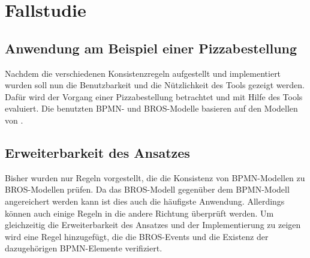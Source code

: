 \chapter{Fallstudie}

\section{Anwendung am Beispiel einer Pizzabestellung}

Nachdem die verschiedenen Konsistenzregeln aufgestellt und implementiert wurden soll nun die Benutzbarkeit und die Nützlichkeit des Tools gezeigt werden.
Dafür wird der Vorgang einer Pizzabestellung betrachtet und mit Hilfe des Tools evaluiert.
Die benutzten BPMN- und BROS-Modelle basieren auf den Modellen von \cite{Schoen}.

\section{Erweiterbarkeit des Ansatzes}

Bisher wurden nur Regeln vorgestellt, die die Konsistenz von BPMN-Modellen zu BROS-Modellen prüfen.
Da das BROS-Modell gegenüber dem BPMN-Modell angereichert werden kann ist dies auch die häufigste Anwendung.
Allerdings können auch einige Regeln in die andere Richtung überprüft werden.
Um gleichzeitig die Erweiterbarkeit des Ansatzes und der Implementierung zu zeigen wird eine Regel hinzugefügt, die die BROS-Events und die Existenz der dazugehörigen BPMN-Elemente verifiziert.
